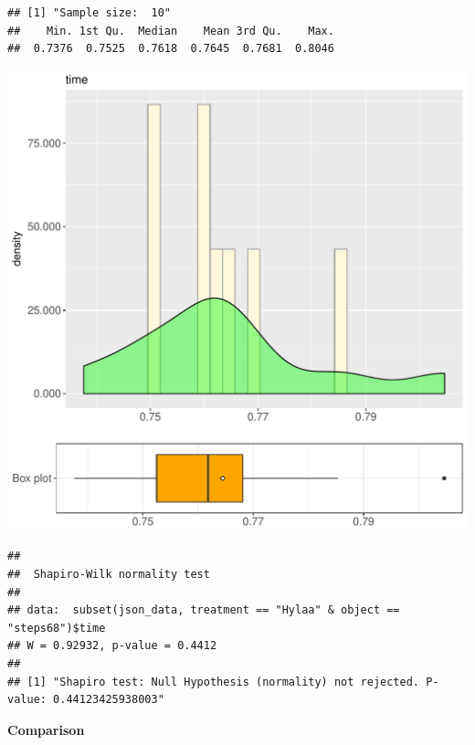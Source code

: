 \documentclass{article}\usepackage[]{graphicx}\usepackage[]{color}
\makeatletter
\def\maxwidth{ %
  \ifdim\Gin@nat@width>\linewidth
    \linewidth
  \else
    \Gin@nat@width
  \fi
}
\newenvironment{kframe}{%
 \def\at@end@of@kframe{}%
 \ifinner\ifhmode%
  \def\at@end@of@kframe{\end{minipage}}%
  \begin{minipage}{\columnwidth}%
 \fi\fi%
 \def\FrameCommand##1{\hskip\@totalleftmargin \hskip-\fboxsep
 \colorbox{shadecolor}{##1}\hskip-\fboxsep
     \hskip-\linewidth \hskip-\@totalleftmargin \hskip\columnwidth}%
 \MakeFramed {\advance\hsize-\width
   \@totalleftmargin\z@ \linewidth\hsize
   \@setminipage}}%
 {\par\unskip\endMakeFramed%
 \at@end@of@kframe}
\newenvironment{knitrout}{}{} %
\makeatother
\begin{document}
\begin{knitrout}
\color{fgcolor}\begin{kframe}
\begin{verbatim}
## [1] "Sample size:  10"
##    Min. 1st Qu.  Median    Mean 3rd Qu.    Max. 
##  0.7376  0.7525  0.7618  0.7645  0.7681  0.8046
\end{verbatim}
\end{kframe}
\includegraphics[width=\maxwidth]{figure/RH3_Hylaa_steps68-1} 
\begin{kframe}\begin{verbatim}
## 
## 	Shapiro-Wilk normality test
## 
## data:  subset(json_data, treatment == "Hylaa" & object == "steps68")$time
## W = 0.92932, p-value = 0.4412
## 
## [1] "Shapiro test: Null Hypothesis (normality) not rejected. P-value: 0.44123425938003"
\end{verbatim}
\end{kframe}
\end{knitrout}
  
 \textbf{Comparison}
  
\end{document}
